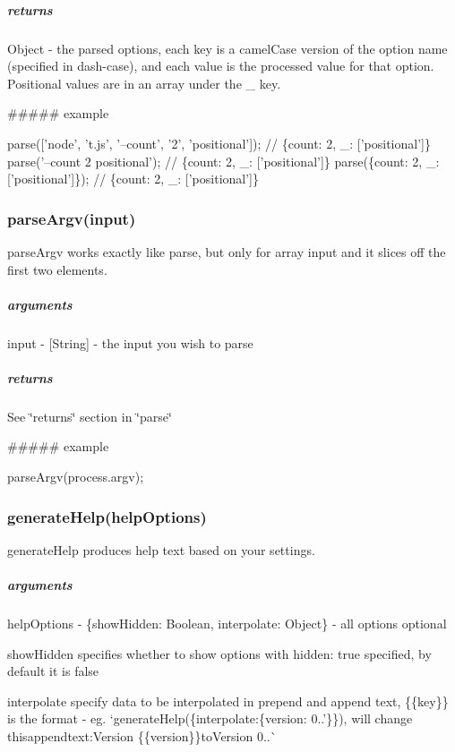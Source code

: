 \subparagraph*{returns}

{\ttfamily Object} -\/ the parsed options, each key is a camel\+Case version of the option name (specified in dash-\/case), and each value is the processed value for that option. Positional values are in an array under the {\ttfamily \+\_\+} key.

\#\#\#\#\# example 
\begin{DoxyCode}
parse(['node', 't.js', '--count', '2', 'positional']); // \{count: 2, \_: ['positional']\}
parse('--count 2 positional');                         // \{count: 2, \_: ['positional']\}
parse(\{count: 2, \_:['positional']\});                   // \{count: 2, \_: ['positional']\}
\end{DoxyCode}


\subsubsection*{parse\+Argv(input)}

{\ttfamily parse\+Argv} works exactly like {\ttfamily parse}, but only for array input and it slices off the first two elements.

\subparagraph*{arguments}


\begin{DoxyItemize}
\item input -\/ {\ttfamily \mbox{[}String\mbox{]}} -\/ the input you wish to parse
\end{DoxyItemize}

\subparagraph*{returns}

See \char`\"{}returns\char`\"{} section in \char`\"{}parse\char`\"{}

\#\#\#\#\# example 
\begin{DoxyCode}
parseArgv(process.argv);
\end{DoxyCode}


\subsubsection*{generate\+Help(help\+Options)}

{\ttfamily generate\+Help} produces help text based on your settings.

\subparagraph*{arguments}


\begin{DoxyItemize}
\item help\+Options -\/ {\ttfamily \{show\+Hidden\+: Boolean, interpolate\+: Object\}} -\/ all options optional
\begin{DoxyItemize}
\item {\ttfamily show\+Hidden} specifies whether to show options with {\ttfamily hidden\+: true} specified, by default it is {\ttfamily false}
\item {\ttfamily interpolate} specify data to be interpolated in {\ttfamily prepend} and {\ttfamily append} text, {\ttfamily \{\{key\}\}} is the format -\/ eg. `generate\+Help(\{interpolate\+:\{version\+: \textquotesingle{}0..'\}\}){\ttfamily , will change this}append{\ttfamily text\+:}Version \{\{version\}\}{\ttfamily to}Version 0..\`{}
\end{DoxyItemize}
\end{DoxyItemize}


